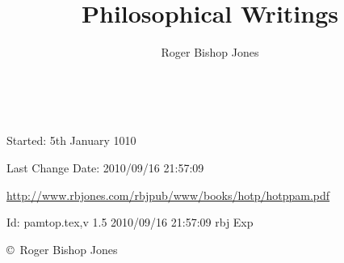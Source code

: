 \documentclass[10pt,a4paper.titlepage,openany,twocolumn]{book}
\author{Roger Bishop Jones}
\title{Philosophical Writings}
\date{\ }
\begin{document}
\frontmatter

\begin{titlepage}
\maketitle

\vfill

\begin{centering}

{\footnotesize

Started: 5th January 1010

Last Change $ $Date: 2010/09/16 21:57:09 $ $

\href{http://www.rbjones.com/rbjpub/www/books/hotp/hotppam.pdf}
{http://www.rbjones.com/rbjpub/www/books/hotp/hotppam.pdf}

$ $Id: pamtop.tex,v 1.5 2010/09/16 21:57:09 rbj Exp $ $

\copyright\ Roger Bishop Jones

}%

\end{centering}

\thispagestyle{empty}
\end{titlepage}

\onecolumn

{\parskip=0pt\tableofcontents}

\vfill

\pagebreak

\twocolumn
\end{document}
